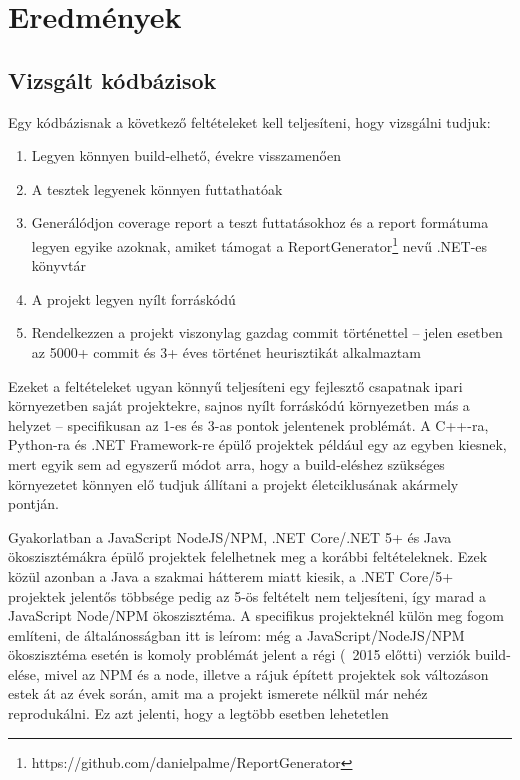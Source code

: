 \chapter{Eredmények}
\label{ch:results}

\section{Vizsgált kódbázisok}

Egy kódbázisnak a következő feltételeket kell teljesíteni, hogy vizsgálni tudjuk:
\begin{enumerate}
    \item Legyen könnyen build-elhető, évekre visszamenően
    \item A tesztek legyenek könnyen futtathatóak
    \item Generálódjon coverage report a teszt futtatásokhoz és a report formátuma legyen egyike azoknak, amiket támogat a ReportGenerator\footnote{https://github.com/danielpalme/ReportGenerator} nevű .NET-es könyvtár
    \item A projekt legyen nyílt forráskódú
    \item Rendelkezzen a projekt viszonylag gazdag commit történettel -- jelen esetben az 5000+ commit és 3+ éves történet heurisztikát alkalmaztam
\end{enumerate}

Ezeket a feltételeket ugyan könnyű teljesíteni egy fejlesztő csapatnak ipari környezetben saját projektekre, sajnos nyílt forráskódú környezetben más a helyzet -- specifikusan az 1-es és 3-as pontok jelentenek problémát. A C++-ra, Python-ra és .NET Framework-re épülő projektek például egy az egyben kiesnek, mert egyik sem ad egyszerű módot arra, hogy a build-eléshez szükséges környezetet könnyen elő tudjuk állítani a projekt életciklusának akármely pontján.

Gyakorlatban a JavaScript NodeJS/NPM, .NET Core/.NET 5+ és Java ökoszisztémákra épülő projektek felelhetnek meg a korábbi feltételeknek. Ezek közül azonban a Java a szakmai hátterem miatt kiesik, a .NET Core/5+ projektek jelentős többsége pedig az 5-ös feltételt nem teljesíteni, így marad a JavaScript Node/NPM ökoszisztéma. A specifikus projekteknél külön meg fogom említeni, de általánosságban itt is leírom: még a JavaScript/NodeJS/NPM ökoszisztéma esetén is komoly problémát jelent a régi (~2015 előtti) verziók build-elése, mivel az NPM és a node, illetve a rájuk épített projektek sok változáson estek át az évek során, amit ma a projekt ismerete nélkül már nehéz reprodukálni. Ez azt jelenti, hogy a legtöbb esetben lehetetlen

